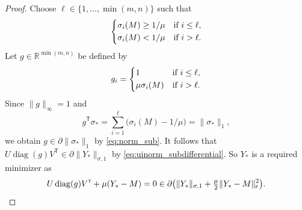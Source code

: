 \documentclass[11pt,reqno]{amsart}
\newcommand{\tp}{{\scriptscriptstyle\mathsf{T}}}
\newcommand{\st}{\sigma}
\newcommand{\F}{{\scriptscriptstyle\mathsf{F}}}
\DeclareMathOperator{\diag}{diag}
\theoremstyle{definition}
\numberwithin{equation}{section}
\newcommand{\R}{\mathbb{R}}
\begin{document}
\begin{proof}
Choose $\ell\in \{1,\dots,\min(m,n)\}$ such that
\[\begin{dcases}
\sigma_i(M) \ge 1/\mu  & \text{if } i \le \ell,\\
\sigma_i(M) < 1/\mu & \text{if } i > \ell.
\end{dcases}\]
Let $g \in \R^{\min (m, n)}$ be defined by
\[
g_{i} = \begin{dcases}
    1  & \text{if } i \le \ell,\\
    \mu \sigma_i(M) & \text{if } i > \ell.
    \end{dcases}
\]
Since $\lVert g \lVert_\infty = 1$ and 
\[
    g^\tp \sigma_* = \sum_{i=1}^\ell \bigl(\sigma_i(M)-1/\mu \bigr) = \lVert \sigma_* \rVert_1,
\]
we obtain $g\in \partial \lVert \sigma_* \rVert_1$ by \eqref{eq:norm_sub}. It follows that $U\diag(g)V^\tp \in \partial \lVert Y_* \rVert_{\st,1}$ by \eqref{eq:uinorm_subdifferential}. So $Y_*$ is a required minimizer as
\[
U\diag(g)V^\tp + \mu (Y_* -M) = 0 \in \partial \bigl( \lVert Y_* \rVert_{\st,1} + \tfrac{\mu}{2} \lVert Y_* - M \rVert_\F^2\bigr). \qedhere
\]
\end{proof}
\end{document}
